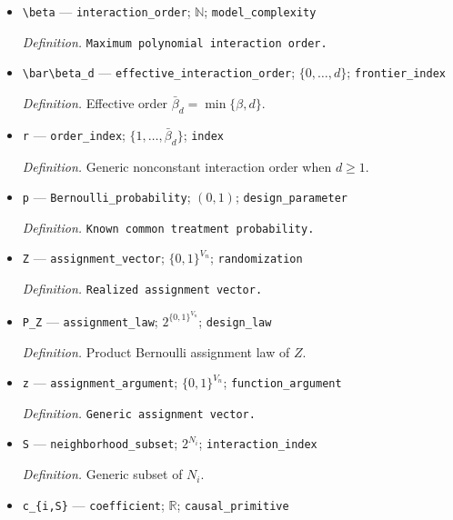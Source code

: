 \documentclass{article}
\begin{document}
\begin{itemize}
  \par\smallskip\noindent\emph{Definition.} \texttt{Common upper bound on in-\allowbreak{}degrees and out-\allowbreak{}degrees.}
  \item \texttt{\textbackslash{}\allowbreak{}beta} --- \texttt{interaction\_\allowbreak{}order}; \(\mathbb N\); \texttt{model\_\allowbreak{}complexity}
  \par\smallskip\noindent\emph{Definition.} \texttt{Maximum polynomial interaction order.}
  \item \texttt{\textbackslash{}\allowbreak{}bar\textbackslash{}\allowbreak{}beta\_\allowbreak{}d} --- \texttt{effective\_\allowbreak{}interaction\_\allowbreak{}order}; \(\{0,\ldots,d\}\); \texttt{frontier\_\allowbreak{}index}
  \par\smallskip\noindent\emph{Definition.} Effective order \(\bar\beta_d=\min\{\beta,d\}\).
  \item \texttt{r} --- \texttt{order\_\allowbreak{}index}; \(\{1,\ldots,\bar\beta_d\}\); \texttt{index}
  \par\smallskip\noindent\emph{Definition.} Generic nonconstant interaction order when \(d\ge1\).
  \item \texttt{p} --- \texttt{Bernoulli\_\allowbreak{}probability}; \((0,1)\); \texttt{design\_\allowbreak{}parameter}
  \par\smallskip\noindent\emph{Definition.} \texttt{Known common treatment probability.}
  \item \texttt{Z} --- \texttt{assignment\_\allowbreak{}vector}; \(\{0,1\}^{V_n}\); \texttt{randomization}
  \par\smallskip\noindent\emph{Definition.} \texttt{Realized assignment vector.}
  \item \texttt{P\_\allowbreak{}Z} --- \texttt{assignment\_\allowbreak{}law}; \(2^{\{0,1\}^{V_n}}\); \texttt{design\_\allowbreak{}law}
  \par\smallskip\noindent\emph{Definition.} Product Bernoulli assignment law of \(Z\).
  \item \texttt{z} --- \texttt{assignment\_\allowbreak{}argument}; \(\{0,1\}^{V_n}\); \texttt{function\_\allowbreak{}argument}
  \par\smallskip\noindent\emph{Definition.} \texttt{Generic assignment vector.}
  \item \texttt{S} --- \texttt{neighborhood\_\allowbreak{}subset}; \(2^{N_i}\); \texttt{interaction\_\allowbreak{}index}
  \par\smallskip\noindent\emph{Definition.} Generic subset of \(N_i\).
  \item \texttt{c\_\allowbreak{}\{i,\allowbreak{}S\}\allowbreak{}} --- \texttt{coefficient}; \(\mathbb R\); \texttt{causal\_\allowbreak{}primitive}

\end{itemize}
\end{document}
